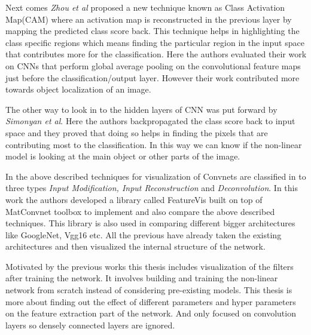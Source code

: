 Next comes \textit{Zhou et al}\cite{Zhou15} proposed a new technique known as Class Activation Map(CAM) where an activation map is reconstructed in the previous layer by mapping the predicted class score back. This technique helps in highlighting the class specific regions which means finding the particular region in the input space that contributes more for the classification. Here the authors evaluated their work on CNNs that perform global average pooling on the convolutional feature maps just before the classification/output layer. However their work contributed more towards object localization of an image.

The other way to look in to the hidden layers of CNN was put forward by \textit{Simonyan et al}\cite{Simonyan13}. Here the authors backpropagated the class score back to input space and they proved that doing so helps in finding the pixels that are contributing most to the classification. In this way we can know if the non-linear model is looking at the main object or other parts of the image.

In \cite{Felix} the above described techniques for visualization of Convnets are classified in to three types \textit{Input Modification, Input Reconstruction } and \textit{Deconvolution}. In this work the authors developed a library called FeatureVis built on top of MatConvnet toolbox to implement and also compare the above described techniques. This library is also used in comparing different bigger architectures like GoogleNet, Vgg16 etc. All the previous have already taken the existing architectures and then visualized the internal structure of the network.

Motivated by the previous works this thesis includes visualization of the filters after training the network. It involves building and training the non-linear network from scratch instead of considering pre-existing models. This thesis is more about finding out the effect of different parameters and hyper parameters on the feature extraction part of the network. And only focused on convolution layers so densely connected layers are ignored.